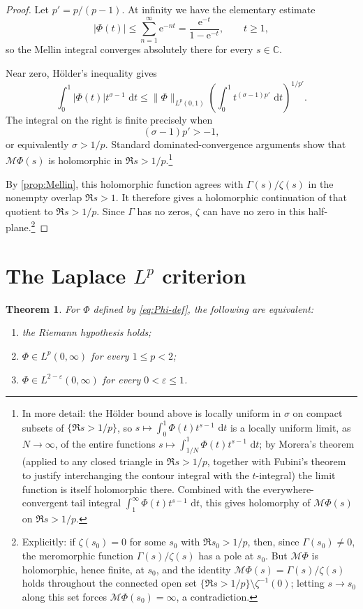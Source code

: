\documentclass[11pt]{article}
\newtheorem{theorem}{Theorem}[section]
\theoremstyle{remark}
\newcommand{\C}{\mathbb C}
\newcommand{\e}{\mathrm e}
\newcommand{\dd}{\,\mathrm d}
\newcommand{\Mellin}{\mathscr M}
\begin{document}
\begin{proof}
Let \(p'=p/(p-1)\).  At infinity we have the elementary estimate
\[
 |\Phi(t)|
 \leq\sum_{n=1}^{\infty}\e^{-nt}
 =\frac{\e^{-t}}{1-\e^{-t}},
 \qquad t\geq1,
\]
so the Mellin integral converges absolutely there for every \(s\in\C\).

Near zero, H\"older's inequality gives
\[
 \int_0^1|\Phi(t)|t^{\sigma-1}\,\dd t
 \leq
 \|\Phi\|_{L^p(0,1)}
 \left(
 \int_0^1 t^{(\sigma-1)p'}\,\dd t
 \right)^{1/p'}.
\]
The integral on the right is finite precisely when
\[
 (\sigma-1)p'>-1,
\]
or equivalently \(\sigma>1/p\).  Standard dominated-convergence
arguments show that \(\Mellin\Phi(s)\) is holomorphic in
\(\Re s>1/p\).\footnote{In more detail: the H\"older bound above is
locally uniform in \(\sigma\) on compact subsets of
\(\{\Re s>1/p\}\), so \(s\mapsto\int_0^1\Phi(t)t^{s-1}\,\dd t\) is a
locally uniform limit, as \(N\to\infty\), of the entire functions
\(s\mapsto\int_{1/N}^1\Phi(t)t^{s-1}\,\dd t\); by Morera's theorem
(applied to any closed triangle in \(\Re s>1/p\), together with
Fubini's theorem to justify interchanging the contour integral with
the \(t\)-integral) the limit function is itself holomorphic there.
Combined with the everywhere-convergent tail integral
\(\int_1^\infty\Phi(t)t^{s-1}\,\dd t\), this gives holomorphy of
\(\Mellin\Phi(s)\) on \(\Re s>1/p\).}

By \cref{prop:Mellin}, this holomorphic function agrees with
\(\Gamma(s)/\zeta(s)\) in the nonempty overlap \(\Re s>1\).
It therefore gives a holomorphic continuation of that quotient to
\(\Re s>1/p\).  Since \(\Gamma\) has no zeros, \(\zeta\) can have no
zero in this half-plane.\footnote{Explicitly: if \(\zeta(s_0)=0\) for
some \(s_0\) with \(\Re s_0>1/p\), then, since \(\Gamma(s_0)\neq0\),
the meromorphic function \(\Gamma(s)/\zeta(s)\) has a pole at
\(s_0\). But \(\Mellin\Phi\) is holomorphic, hence finite, at
\(s_0\), and the identity \(\Mellin\Phi(s)=\Gamma(s)/\zeta(s)\) holds
throughout the connected open set \(\{\Re s>1/p\}\setminus
\zeta^{-1}(0)\); letting \(s\to s_0\) along this set forces
\(\Mellin\Phi(s_0)=\infty\), a contradiction.}
\end{proof}

\section{The Laplace \texorpdfstring{\(L^p\)}{Lp} criterion}
\begin{theorem}\label{thm:laplace}
For \(\Phi\) defined by \eqref{eq:Phi-def}, the following are
equivalent:
\begin{enumerate}[label=\textup{(\roman*)}]
\item the Riemann hypothesis holds;
\item \(\Phi\in L^p(0,\infty)\) for every \(1\leq p<2\);
\item \(\Phi\in L^{2-\varepsilon}(0,\infty)\) for every
      \(0<\varepsilon\leq1\).
\end{enumerate}
\end{theorem}
\end{document}
